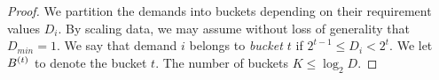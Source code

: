 \begin{proof}
%	
%	
%	
%	
%	
	We partition the demands into buckets depending on their requirement values $D_i$. By scaling data, we may assume without loss of generality that $D_{min} = 1$.
	We say that demand $i$ belongs to \emph{bucket $t$} if $2^{t-1} \leq D_i < 2^t$. We let $B^{(t)}$ to denote the bucket $t$. The number of buckets $K \leq \log_2 D$.



\end{proof}

